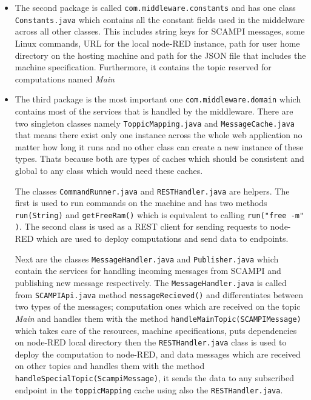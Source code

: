 \begin{itemize}
\item The second package is called \verb|com.middleware.constants| and has one class \verb|Constants.java| which contains all the constant fields used in the middelware across all other classes. This includes string keys for SCAMPI messages, some Linux commands,  URL for the local node-RED instance, path for user home directory on the hosting machine and path for the JSON file that includes the machine specification. Furthermore, it contains the topic reserved for computations named \textit{Main} \\
 
 
 \item The third package is the most important one \verb|com.middleware.domain| which contains most of the services that is handled by the middleware. There are two singleton classes namely \verb|ToppicMapping.java| and \verb|MessageCache.java| that means there exist only one instance across the whole web application no matter how long it runs and no other class can create a new instance of these types. Thats because both are types of caches which should be consistent and global to any class which would need these caches. 
 
 The classes \verb|CommandRunner.java| and \verb|RESTHandler.java| are helpers. The first is used to run commands on the machine and  has two methods \verb|run(String)| and \verb|getFreeRam()| which is equivalent to calling \verb|run("free -m" )|. The second class is used as a REST client for sending requests to node-RED which are used to deploy computations and  send data to endpoints.
 
  Next are the classes \verb|MessageHandler.java| and \verb|Publisher.java| which contain the services for handling incoming messages from SCAMPI and publishing new message respectively. The \verb|MessageHandler.java| is called from  \verb|SCAMPIApi.java| method \verb|messageRecieved()| and differentiates between two types of the messages; computation ones which are received on the topic \textit{Main} and handles them with the method \verb|handleMainTopic(SCAMPIMessage)| which takes care of the resources, machine specifications, puts dependencies on node-RED local directory then the \verb|RESTHandler.java| class is used to deploy the computation to node-RED, and data messages which are received on other topics and handles them with the method \verb|handleSpecialTopic(ScampiMessage)|, it sends the data to any subscribed endpoint in the \verb|toppicMapping| cache using also the \verb|RESTHandler.java|.
 

\end{itemize}
